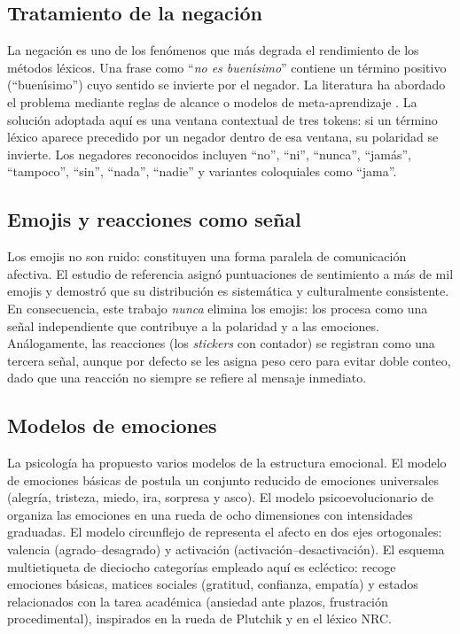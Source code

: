 \subsection{Tratamiento de la negación}

La negación es uno de los fenómenos que más degrada el rendimiento de los métodos
léxicos. Una frase como ``\emph{no es buen\'\i simo}'' contiene un término positivo
(``buen\'\i simo'') cuyo sentido se invierte por el negador. La literatura ha abordado
el problema mediante reglas de alcance \citep{brooke2009negation} o modelos de
meta-aprendizaje \citep{morante2012negation}. La solución adoptada aquí es una ventana
contextual de tres tokens: si un término léxico aparece precedido por un negador dentro
de esa ventana, su polaridad se invierte. Los negadores reconocidos incluyen ``no'',
``ni'', ``nunca'', ``jam\'as'', ``tampoco'', ``sin'', ``nada'', ``nadie'' y variantes
coloquiales como ``jama''.

\subsection{Emojis y reacciones como señal}

Los emojis no son ruido: constituyen una forma paralela de comunicación afectiva. El
estudio de referencia \citet{novak2015emojis} asignó puntuaciones de sentimiento a más
de mil emojis y demostró que su distribución es sistemática y culturalmente consistente.
En consecuencia, este trabajo \emph{nunca} elimina los emojis: los procesa como una
señal independiente que contribuye a la polaridad y a las emociones. Análogamente, las
reacciones (los \emph{stickers} con contador) se registran como una tercera señal,
aunque por defecto se les asigna peso cero para evitar doble conteo, dado que una
reacción no siempre se refiere al mensaje inmediato.

\subsection{Modelos de emociones}

La psicología ha propuesto varios modelos de la estructura emocional. El modelo de
emociones básicas de \citet{ekman1992emotions} postula un conjunto reducido de
emociones universales (alegría, tristeza, miedo, ira, sorpresa y asco). El modelo
psicoevolucionario de \citet{plutchik1980emotions} organiza las emociones en una rueda
de ocho dimensiones con intensidades graduadas. El modelo circunflejo de
\citet{russell1980circumplex} representa el afecto en dos ejes ortogonales: valencia
(agrado--desagrado) y activación (activación--desactivación). El esquema multietiqueta
de dieciocho categorías empleado aquí es ecléctico: recoge emociones básicas, matices
sociales (gratitud, confianza, empatía) y estados relacionados con la tarea académica
(ansiedad ante plazos, frustración procedimental), inspirados en la rueda de Plutchik y
en el léxico NRC.

